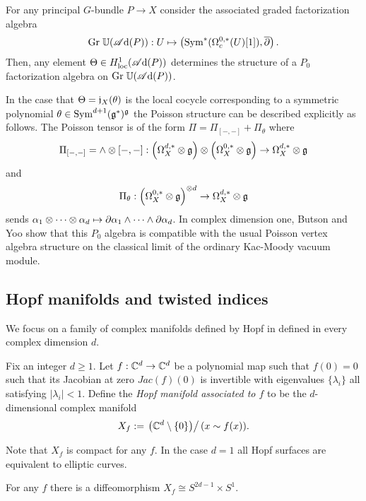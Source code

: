 \documentclass[10pt]{amsart}
\def\sAd{\sA{\rm d}}
\begin{document}
\begin{cor} For any principal $G$-bundle $P \to X$ consider the associated graded factorization algebra
\[
{\rm Gr} \; \UU (\sAd(P)) : U \mapsto \left(\Sym^*(\Omega^{0,*}_c(U) [1]), \dbar \right) .
\]
Then, any element $\Theta \in H^1_{\rm loc}(\sAd(P))$ determines the structure of a $P_0$ factorization algebra on ${\rm Gr} \; \UU (\sAd(P))$. 
\end{cor}

In the case that $\Theta = \mathfrak j_X (\theta)$ is the local cocycle corresponding to a symmetric polynomial $\theta \in {\rm Sym}^{d+1}(\mathfrak g^*)^\mathfrak g$ the Poisson structure can be described explicitly as follows. 
The Poisson tensor is of the form $\Pi = \Pi_{[-,-]} + \Pi_\theta $ where 
\[
\Pi_{[-,-]} = \wedge \otimes [-,-] : \left(\Omega^{d,*}_X \otimes \mathfrak g \right) \otimes \left(\Omega^{0,*}_X \otimes \mathfrak g\right) \to \Omega^{d,*}_X \otimes \mathfrak g 
\] 
and
\[
\Pi_{\theta} : \left(\Omega^{0,*}_X \otimes \mathfrak g\right)^{\otimes d} \to \Omega^{d,*}_X\otimes \mathfrak g
\]
sends $\alpha_1 \otimes \cdots \otimes \alpha_d \mapsto \partial \alpha_1 \wedge \cdots \wedge \partial \alpha_d$. 
In complex dimension one, Butson and Yoo \cite{BY} show that this $P_0$ algebra is compatible with the usual Poisson vertex algebra structure on the classical limit of the ordinary Kac-Moody vacuum module.

\subsection{Hopf manifolds and twisted indices}

We focus on a family of complex manifolds defined by Hopf in \cite{Hopf} defined in every complex dimension $d$. 

\begin{dfn}
Fix an integer $d \geq 1$.
Let $f : \mathbb C^d \to \mathbb C^d$ be a polynomial map such that $f(0) = 0$ such that its Jacobian at zero $Jac(f)(0)$ is invertible with eigenvalues $\{\lambda_i\}$ all satisfying $|\lambda_i|<1$. 
Define the {\em Hopf manifold associated to $f$} to be the $d$-dimensional complex manifold
\[
X_f := \left. \left(\mathbb C^d \setminus \{0\}\right) \right/ (x \sim f(x)) .
\]
\end{dfn}

Note that $X_{f}$ is compact for any $f$. 
In the case $d=1$ all Hopf surfaces are equivalent to elliptic curves.

\begin{lem} 
For any $f$ there is a diffeomorphism $X_f \cong S^{2d-1} \times S^1$.
\end{lem}
\end{document}
